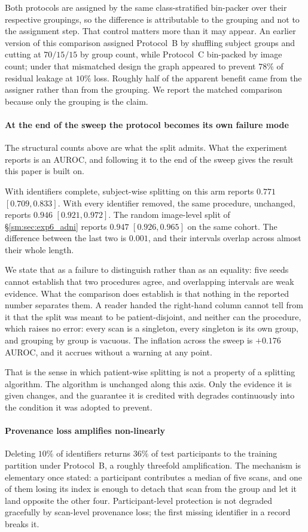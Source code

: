 \documentclass[11pt]{article}
\begin{document}
Both protocols are assigned by the same class-stratified bin-packer
over their respective groupings, so the difference is attributable to
the grouping and not to the assignment step. That control matters more
than it may appear. An earlier version of this comparison assigned
Protocol~B by shuffling subject groups and cutting at $70/15/15$ by
group count, while Protocol~C bin-packed by image count; under that
mismatched design the graph appeared to prevent $78\%$ of residual
leakage at $10\%$ loss. Roughly half of the apparent benefit came from
the assigner rather than from the grouping. We report the matched
comparison because only the grouping is the claim.

\paragraph{At the end of the sweep the protocol becomes its own failure mode}
The structural counts above are what the split admits. What the experiment
reports is an AUROC, and following it to the end of the sweep gives the result
this paper is built on.

With identifiers complete, subject-wise splitting on this arm reports
$0.771$ $[0.709, 0.833]$. With every identifier removed, the same procedure,
unchanged, reports $0.946$ $[0.921, 0.972]$. The random image-level split of
\S\ref{sm:sec:exp6_adni} reports $0.947$ $[0.926, 0.965]$ on the same cohort. The
difference between the last two is $0.001$, and their intervals overlap across
almost their whole length.

We state that as a failure to distinguish rather than as an equality: five
seeds cannot establish that two procedures agree, and overlapping intervals are
weak evidence. What the comparison does establish is that nothing in the
reported number separates them. A reader handed the right-hand column cannot
tell from it that the split was meant to be patient-disjoint, and neither can
the procedure, which raises no error: every scan is a singleton, every
singleton is its own group, and grouping by group is vacuous. The inflation
across the sweep is $+0.176$ AUROC, and it accrues without a warning at any
point.

That is the sense in which patient-wise splitting is not a property of a
splitting algorithm. The algorithm is unchanged along this axis. Only the
evidence it is given changes, and the guarantee it is credited with degrades
continuously into the condition it was adopted to prevent.

\paragraph{Provenance loss amplifies non-linearly}
Deleting $10\%$ of identifiers returns $36\%$ of test participants to
the training partition under Protocol~B, a roughly threefold
amplification. The mechanism is elementary once stated: a participant
contributes a median of five scans, and one of them losing its index
is enough to detach that scan from the group and let it land opposite
the other four. Participant-level protection is not degraded
gracefully by scan-level provenance loss; the first missing identifier
in a record breaks it.
\end{document}
